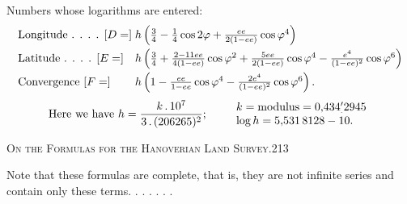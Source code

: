 Numbers whose logarithms are entered:
\[
\begin{array}{@{}l@{\;}l@{}}
\text{Longitude . . . . }[D=]&h\left(\frac34-\frac14\cos2\varphi+\frac{ee}{2(1-ee)}\cos\varphi^4\right)\\[6pt]
\text{Latitude . . . . }[E=]&h\left(\frac34+\frac{2-11ee}{4(1-ee)}\cos\varphi^2+\frac{5ee}{2(1-ee)}\cos\varphi^4-\frac{e^4}{(1-ee)^2}\cos\varphi^6\right)\\[6pt]
\text{Convergence }[F=]&h\left(1-\frac{ee}{1-ee}\cos\varphi^4-\frac{2e^4}{(1-ee)^2}\cos\varphi^6\right).
\end{array}
\]
\[
\text{Here we have }h=\frac{k\,.\,10^7}{3\,.\,(206265)^2};\qquad
\begin{array}{l}
k=\text{modulus}=0{,}434\rlap{\raisebox{-.5ex}{\tiny.}}^{\prime}2945\\
\log h=5{,}531\,8128-10.
\end{array}
\]

\par\clearpage
\noindent\mbox{}\hfill{\small\textsc{On the Formulas for the Hanoverian Land Survey.}}\hfill213\par\medskip
Note that these formulas are complete, that is, they are not infinite series and contain only these terms. . . . . . .

